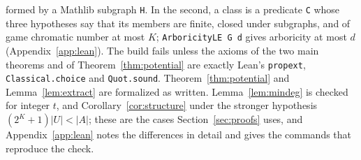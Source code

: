 \documentclass[11pt]{article}
\theoremstyle{remark}
\begin{document}
formed by a Mathlib subgraph \texttt{H}. In the second, a class is a
predicate \texttt{C} whose three hypotheses say that its members are
finite, closed under subgraphs, and of game chromatic number at most $K$; \texttt{ArboricityLE G d} gives arboricity at most $d$
(Appendix~\ref{app:lean}). The build fails unless the axioms of
the two main theorems and of Theorem~\ref{thm:potential} are exactly
Lean's \texttt{propext}, \texttt{Classical.choice} and \texttt{Quot.sound}.
Theorem~\ref{thm:potential} and Lemma~\ref{lem:extract} are formalized as
written. Lemma~\ref{lem:mindeg} is checked for integer $t$, and
Corollary~\ref{cor:structure} under the stronger hypothesis
$(2^K+1)|U|<|A|$; these are the cases Section~\ref{sec:proofs} uses, and
Appendix~\ref{app:lean} notes the differences in detail and gives the
commands that reproduce the check.
\end{document}
